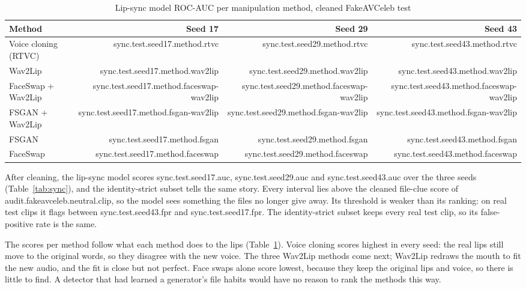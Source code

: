 \documentclass[conference]{IEEEtran}
\begin{document}
\begin{table}[htbp]
\caption{Lip-sync model ROC-AUC per manipulation method, cleaned FakeAVCeleb
test}
\label{tab:methods}
\centering
\begin{tabular}{lrrr}
\toprule
Method & Seed 17 & Seed 29 & Seed 43 \\
\midrule
Voice cloning (RTVC) & {{sync.test.seed17.method.rtvc}} & {{sync.test.seed29.method.rtvc}} & {{sync.test.seed43.method.rtvc}} \\
Wav2Lip & {{sync.test.seed17.method.wav2lip}} & {{sync.test.seed29.method.wav2lip}} & {{sync.test.seed43.method.wav2lip}} \\
FaceSwap + Wav2Lip & {{sync.test.seed17.method.faceswap-wav2lip}} & {{sync.test.seed29.method.faceswap-wav2lip}} & {{sync.test.seed43.method.faceswap-wav2lip}} \\
FSGAN + Wav2Lip & {{sync.test.seed17.method.fsgan-wav2lip}} & {{sync.test.seed29.method.fsgan-wav2lip}} & {{sync.test.seed43.method.fsgan-wav2lip}} \\
FSGAN & {{sync.test.seed17.method.fsgan}} & {{sync.test.seed29.method.fsgan}} & {{sync.test.seed43.method.fsgan}} \\
FaceSwap & {{sync.test.seed17.method.faceswap}} & {{sync.test.seed29.method.faceswap}} & {{sync.test.seed43.method.faceswap}} \\
\bottomrule
\end{tabular}
\end{table}

After cleaning, the lip-sync model scores {{sync.test.seed17.auc}},
{{sync.test.seed29.auc}} and {{sync.test.seed43.auc}} over the three seeds
(Table~\ref{tab:sync}), and the identity-strict subset tells the same story.
Every interval lies above the cleaned file-clue score of
{{audit.fakeavceleb.neutral.clip}}, so the model sees something the files no
longer give away. Its threshold is weaker than its ranking: on real test clips
it flags between {{sync.test.seed43.fpr}} and {{sync.test.seed17.fpr}}. The
identity-strict subset keeps every real test clip, so its false-positive rate
is the same.

The scores per method follow what each method does to the lips
(Table~\ref{tab:methods}). Voice cloning scores highest in every seed: the real
lips still move to the original words, so they disagree with the new voice.
The three Wav2Lip methods come next; Wav2Lip redraws the mouth to fit the new
audio, and the fit is close but not perfect. Face swaps alone score lowest,
because they keep the original lips and voice, so there is little to find. A
detector that had learned a generator's file habits would have no reason to
rank the methods this way.
\end{document}
